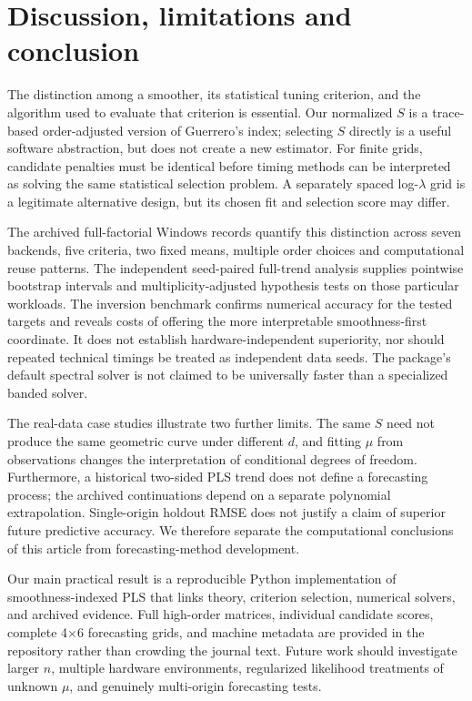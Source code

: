 \documentclass[pdflatex,sn-mathphys-ay]{sn-jnl}
\begin{document}
\section{Discussion, limitations and conclusion}\label{sec:sncs-conclusion}
The distinction among a smoother, its statistical tuning
criterion, and the algorithm used to evaluate that criterion
is essential. Our normalized $S$ is a trace-based order-adjusted
version of Guerrero's index; selecting $S$ directly is a useful
software abstraction, but does not create a new estimator.
For finite grids, candidate penalties must be identical before
timing methods can be interpreted as solving the same
statistical selection problem. A separately spaced
log-$\lambda$ grid is a legitimate alternative design,
but its chosen fit and selection score may differ.

The archived full-factorial Windows records quantify this
distinction across seven backends, five criteria, two fixed
means, multiple order choices and computational reuse patterns.
The independent seed-paired full-trend analysis supplies
pointwise bootstrap intervals and multiplicity-adjusted
hypothesis tests on those particular workloads. The inversion
benchmark confirms numerical accuracy for the tested targets
and reveals costs of offering the more interpretable
smoothness-first coordinate. It does not establish
hardware-independent superiority, nor should repeated
technical timings be treated as independent data seeds.
The package's default spectral solver is not claimed
to be universally faster than a specialized banded solver.

The real-data case studies illustrate two further limits.
The same $S$ need not produce the same geometric curve
under different $d$, and fitting $\mu$ from observations
changes the interpretation of conditional degrees of
freedom. Furthermore, a historical two-sided PLS trend
does not define a forecasting process; the archived
continuations depend on a separate polynomial extrapolation.
Single-origin holdout RMSE does not justify a claim of
superior future predictive accuracy. We therefore separate
the computational conclusions of this article from
forecasting-method development.

Our main practical result is a reproducible Python
implementation of smoothness-indexed PLS that links
theory, criterion selection, numerical solvers, and
archived evidence. Full high-order matrices, individual
candidate scores, complete 4$\times$6 forecasting grids,
and machine metadata are provided in the repository
rather than crowding the journal text. Future work should
investigate larger $n$, multiple hardware environments,
regularized likelihood treatments of unknown $\mu$,
and genuinely multi-origin forecasting tests.
\end{document}
